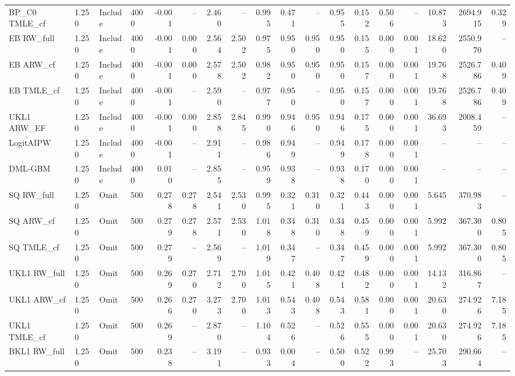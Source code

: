 \begin{tabular}{llllrrrrrrrrrrrrrr}
BP\_C0 TMLE\_cf & 1.250 & Include & 4000 & -0.001 & -- & 2.460 & -- & 0.995 & 0.471 & -- & 0.955 & 0.152 & 0.506 & -- & 10.873 & 2694.915 & 0.329 \\
EB RW\_full & 1.250 & Include & 4000 & -0.001 & 0.000 & 2.564 & 2.502 & 0.975 & 0.950 & 0.950 & 0.950 & 0.155 & 0.000 & 0.001 & 18.620 & 2550.970 & -- \\
EB ARW\_cf & 1.250 & Include & 4000 & -0.001 & 0.000 & 2.578 & 2.502 & 0.982 & 0.950 & 0.950 & 0.950 & 0.157 & 0.000 & 0.001 & 19.768 & 2526.786 & 0.409 \\
EB TMLE\_cf & 1.250 & Include & 4000 & -0.001 & -- & 2.590 & -- & 0.977 & 0.950 & -- & 0.950 & 0.157 & 0.000 & 0.001 & 19.768 & 2526.786 & 0.409 \\
UKL1 ARW\_EF & 1.250 & Include & 4000 & -0.001 & 0.000 & 2.858 & 2.845 & 0.990 & 0.946 & 0.950 & 0.946 & 0.175 & 0.000 & 0.001 & 36.693 & 2008.459 & -- \\
LogitAIPW & 1.250 & Include & 4000 & -0.001 & -- & 2.911 & -- & 0.986 & 0.949 & -- & 0.949 & 0.178 & 0.000 & 0.001 & -- & -- & -- \\
DML-GBM & 1.250 & Include & 4000 & 0.010 & -- & 2.855 & -- & 0.959 & 0.938 & -- & 0.938 & 0.170 & 0.000 & 0.001 & -- & -- & -- \\
SQ RW\_full & 1.250 & Omit & 500 & 0.278 & 0.278 & 2.541 & 2.530 & 0.995 & 0.321 & 0.310 & 0.321 & 0.443 & 0.000 & 0.001 & 5.645 & 370.983 & -- \\
SQ ARW\_cf & 1.250 & Omit & 500 & 0.279 & 0.278 & 2.571 & 2.530 & 1.018 & 0.348 & 0.310 & 0.348 & 0.459 & 0.000 & 0.001 & 5.992 & 367.300 & 0.805 \\
SQ TMLE\_cf & 1.250 & Omit & 500 & 0.279 & -- & 2.569 & -- & 1.019 & 0.347 & -- & 0.347 & 0.459 & 0.000 & 0.001 & 5.992 & 367.300 & 0.805 \\
UKL1 RW\_full & 1.250 & Omit & 500 & 0.269 & 0.270 & 2.712 & 2.700 & 1.015 & 0.421 & 0.408 & 0.421 & 0.482 & 0.000 & 0.001 & 14.132 & 316.867 & -- \\
UKL1 ARW\_cf & 1.250 & Omit & 500 & 0.266 & 0.270 & 3.273 & 2.700 & 1.013 & 0.543 & 0.408 & 0.543 & 0.581 & 0.000 & 0.001 & 20.630 & 274.926 & 7.185 \\
UKL1 TMLE\_cf & 1.250 & Omit & 500 & 0.269 & -- & 2.870 & -- & 1.104 & 0.526 & -- & 0.526 & 0.555 & 0.000 & 0.001 & 20.630 & 274.926 & 7.185 \\
BKL1 RW\_full & 1.250 & Omit & 500 & 0.238 & -- & 3.191 & -- & 0.933 & 0.004 & -- & 0.500 & 0.522 & 0.993 & -- & 25.703 & 290.664 & -- \\

\end{tabular}
